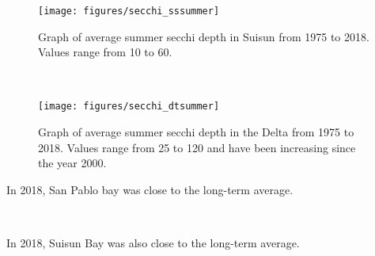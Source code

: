 \documentclass[
]{book}
\begin{document}
\begin{panel-grid}
\begin{columns-nocenter}
\begin{column800}

\begin{expand}

\begin{figure}
\texttt{[image: figures/secchi\_sssummer]} \caption{Graph of average summer secchi depth in Suisun from 1975 to 2018. Values range from 10 to 60.}\label{fig:unnamed-chunk-52}
\end{figure}

\end{expand}

\end{column800}

\begin{column40}

~

\end{column40}

\begin{column800}

\begin{expand}

\begin{figure}
\texttt{[image: figures/secchi\_dtsummer]} \caption{Graph of average summer secchi depth in the Delta from 1975 to 2018. Values range from 25 to 120 and have been increasing since the year 2000.}\label{fig:unnamed-chunk-53}
\end{figure}

\end{expand}

\end{column800}

\end{columns-nocenter}

\begin{columns-nocenter}

\begin{column800}

In 2018, San Pablo bay was close to the long-term average.

\end{column800}

\begin{column40}

~

\end{column40}

\begin{column800}

In 2018, Suisun Bay was also close to the long-term average.


\end{column800}
\end{columns-nocenter}
\end{panel-grid}
\end{document}
